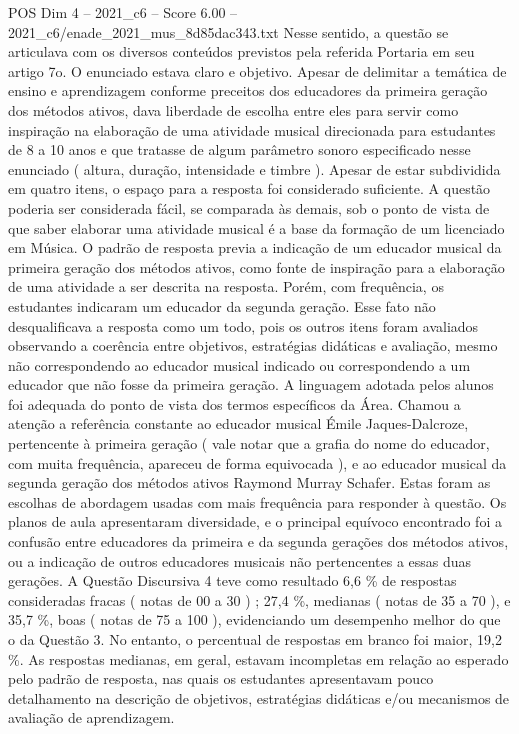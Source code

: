 \begin{textsample}{POS Dim 4 – 2021\_c6 – Score 6.00 – 2021\_c6/enade\_2021\_mus\_8d85dac343.txt}
Nesse sentido, a questão se articulava com os diversos conteúdos previstos pela referida Portaria em seu artigo 7o.
O enunciado estava claro e objetivo.
Apesar de delimitar a temática de ensino e aprendizagem conforme preceitos dos educadores da primeira geração dos métodos ativos, dava liberdade de escolha entre eles para servir como inspiração na elaboração de uma atividade musical direcionada para estudantes de 8 a 10 anos e que tratasse de algum parâmetro sonoro especificado nesse enunciado ( altura, duração, intensidade e timbre ).
Apesar de estar subdividida em quatro itens, o espaço para a resposta foi considerado suficiente.
A questão poderia ser considerada fácil, se comparada às demais, sob o ponto de vista de que saber elaborar uma atividade musical é a base da formação de um licenciado em Música.
O padrão de resposta previa a indicação de um educador musical da primeira geração dos métodos ativos, como fonte de inspiração para a elaboração de uma atividade a ser descrita na resposta.
Porém, com frequência, os estudantes indicaram um educador da segunda geração.
Esse fato não desqualificava a resposta como um todo, pois os outros itens foram avaliados observando a coerência entre objetivos, estratégias didáticas e avaliação, mesmo não correspondendo ao educador musical indicado ou correspondendo a um educador que não fosse da primeira geração.
A linguagem adotada pelos alunos foi adequada do ponto de vista dos termos específicos da Área.
Chamou a atenção a referência constante ao educador musical Émile Jaques-Dalcroze, pertencente à primeira geração ( vale notar que a grafia do nome do educador, com muita frequência, apareceu de forma equivocada ), e ao educador musical da segunda geração dos métodos ativos Raymond Murray Schafer.
Estas foram as escolhas de abordagem usadas com mais frequência para responder à questão.
Os planos de aula apresentaram diversidade, e o principal equívoco encontrado foi a confusão entre educadores da primeira e da segunda gerações dos métodos ativos, ou a indicação de outros educadores musicais não pertencentes a essas duas gerações.
A Questão Discursiva 4 teve como resultado 6,6 \% de respostas consideradas fracas ( notas de 00 a 30 ) ; 27,4 \%, medianas ( notas de 35 a 70 ), e 35,7 \%, boas ( notas de 75 a 100 ), evidenciando um desempenho melhor do que o da Questão 3.
No entanto, o percentual de respostas em branco foi maior, 19,2 \%.
As respostas medianas, em geral, estavam incompletas em relação ao esperado pelo padrão de resposta, nas quais os estudantes apresentavam pouco detalhamento na descrição de objetivos, estratégias didáticas e/ou mecanismos de avaliação de aprendizagem.

\end{textsample}
